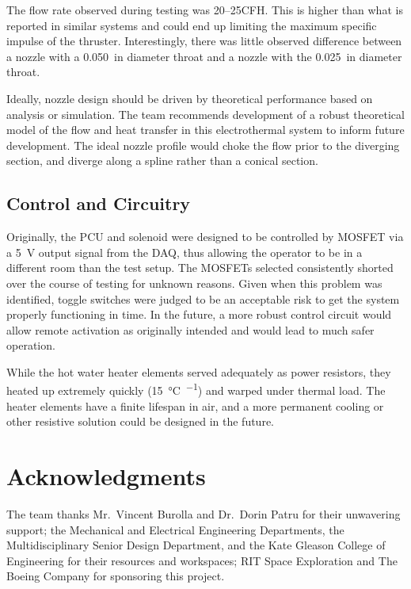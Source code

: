 \documentclass[conference]{IEEEtran}
\begin{document}
The flow rate observed during testing was 20--25\si{CFH}.
This is higher than what is reported in similar systems and could end up limiting the maximum specific impulse of the thruster.
Interestingly, there was little observed difference between a nozzle with a \SI{.050}{in} diameter throat and a nozzle with the \SI{.025}{in} diameter throat.

Ideally, nozzle design should be driven by theoretical performance based on analysis or simulation.
The team recommends development of a robust theoretical model of the flow and heat transfer in this electrothermal system to inform future development.
The ideal nozzle profile would choke the flow prior to the diverging section, and diverge along a spline rather than a conical section.


\subsection{Control and Circuitry}
Originally, the PCU and solenoid were designed to be controlled by MOSFET via a \SI{5}{\volt} output signal from the DAQ, thus allowing the operator to be in a different room than the test setup.
The MOSFETs selected consistently shorted over the course of testing for unknown reasons.
Given when this problem was identified, toggle switches were judged to be an acceptable risk to get the system properly functioning in time.
In the future, a more robust control circuit would allow remote activation as originally intended and would lead to much safer operation.

While the hot water heater elements served adequately as power resistors, they heated up extremely quickly (\SI{15}{\celsius\per\sec}) and warped under thermal load.
The heater elements have a finite lifespan in air, and a more permanent cooling or other resistive solution could be designed in the future.


\section*{Acknowledgments}
The team thanks Mr.~Vincent Burolla and Dr.~Dorin Patru for their unwavering support; the Mechanical and Electrical Engineering Departments, the Multidisciplinary Senior Design Department, and the Kate Gleason College of Engineering for their resources and workspaces; RIT Space Exploration and The Boeing Company for sponsoring this project.
\end{document}
